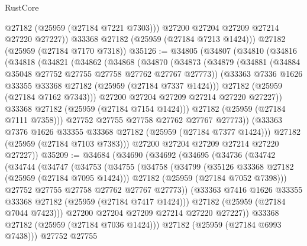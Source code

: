 \begin{lexlean}{RustCore}
\begin{coremodule}
            @27182
            (@25959 (@27184 @7221 @7303)))
          @27200
          @27204
          @27209
          @27214
          @27220
          @27227))
      @33368
      @27182
      (@25959 (@27184 @7213 @1424)))
    @27182
    (@25959 (@27184 @7170 @7318))
@35126 := @34805
    (@34807
      (@34810
        (@34816
          (@34818
            (@34821
              (@34862
                (@34868
                  (@34870
                    (@34873
                      (@34879
                        (@34881 (@34884 @35048 @27752 @27755 @27758 @27762 @27767 @27773))
                        (@33363 @7336 @1626 @33355 @33368 @27182 (@25959 (@27184 @7337 @1424)))
                        @27182
                        (@25959 (@27184 @7162 @7343)))
                      @27200
                      @27204
                      @27209
                      @27214
                      @27220
                      @27227))
                  @33368
                  @27182
                  (@25959 (@27184 @7154 @1424)))
                @27182
                (@25959 (@27184 @7111 @7358)))
              @27752
              @27755
              @27758
              @27762
              @27767
              @27773))
          (@33363 @7376 @1626 @33355 @33368 @27182 (@25959 (@27184 @7377 @1424)))
          @27182
          (@25959 (@27184 @7103 @7383)))
        @27200
        @27204
        @27209
        @27214
        @27220
        @27227))
@35209 := @34684
    (@34690
      (@34692
        (@34695
          (@34736
            (@34742
              (@34744
                (@34747
                  (@34753
                    (@34755
                      (@34758
                        (@34799
                          (@35126 @33368 @27182 (@25959 (@27184 @7095 @1424)))
                          @27182
                          (@25959 (@27184 @7052 @7398)))
                        @27752
                        @27755
                        @27758
                        @27762
                        @27767
                        @27773))
                    (@33363 @7416 @1626 @33355 @33368 @27182 (@25959 (@27184 @7417 @1424)))
                    @27182
                    (@25959 (@27184 @7044 @7423)))
                  @27200
                  @27204
                  @27209
                  @27214
                  @27220
                  @27227))
              @33368
              @27182
              (@25959 (@27184 @7036 @1424)))
            @27182
            (@25959 (@27184 @6993 @7438)))
          @27752
          @27755

\end{coremodule}
\end{lexlean}

